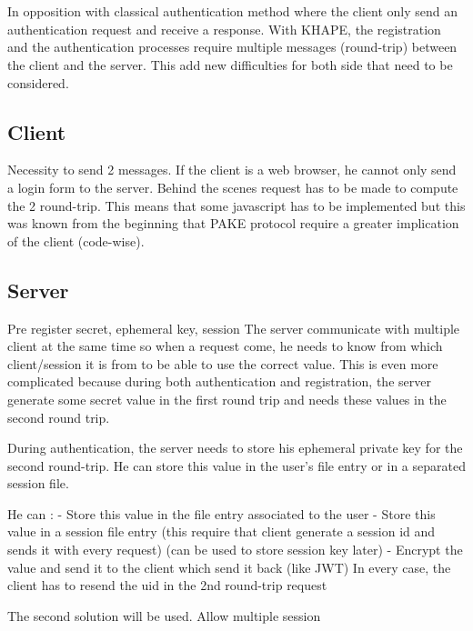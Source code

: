 \documentclass[../report.tex]{subfiles}
\begin{document}
\section{}

In opposition with classical authentication method where the client only send an authentication request and receive a response. With KHAPE, the registration and the authentication processes require multiple messages (round-trip) between the client and the server.
This add new difficulties for both side that need to be considered.

\subsection{Client}
Necessity to send 2 messages. If the client is a web browser, he cannot only send a login form to the server. Behind the scenes request has to be made to compute the 2 round-trip. This means that some javascript has to be implemented but this was known from the beginning that PAKE protocol require a greater implication of the client (code-wise).

\subsection{Server}
Pre register secret, ephemeral key, session
The server communicate with multiple client at the same time so when a request come, he needs to know from which client/session it is from to be able to use the correct value. This is even more complicated because during both authentication and registration, the server generate some secret value in the first round trip and needs these values in the second round trip.



During authentication, the server needs to store his ephemeral private key for the second round-trip. He can store this value in the user's file entry or in a separated session file.

He can :
- Store this value in the file entry associated to the user
- Store this value in a session file entry (this require that client generate a session id and sends it with every request) (can be used to store session key later)
- Encrypt the value and send it to the client which send it back (like JWT)
In every case, the client has to resend the uid in the 2nd round-trip request

The second solution will be used. Allow multiple session
 
\end{document}
